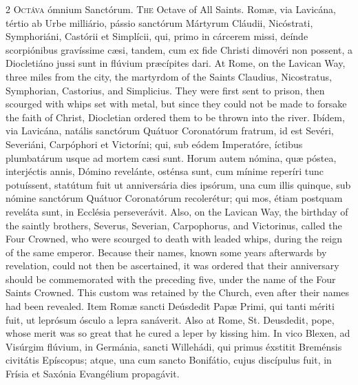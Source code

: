 \begin{paracol}{2}
\lettrine[lines=1]{O}{ctáva} ómnium 
 Sanctórum.
\switchcolumn
{}
\lettrine[lines=1]{T}{he} Octave of All Saints.
\switchcolumn*
{}
Romæ, via Lavicána, 
 tértio ab Urbe milliário, pássio sanctórum Mártyrum Cláudii, Nicóstrati, 
 Symphoriáni, Castórii et Simplícii, qui, primo in cárcerem missi, deínde 
 scorpiónibus gravíssime cæsi, tandem, cum ex fide Christi dimovéri non 
 possent, a Diocletiáno jussi sunt in flúvium præcípites dari.
\switchcolumn
{}
At Rome, on the Lavican Way, three 
 miles from the city, the martyrdom of the Saints Claudius, Nicostratus, 
 Symphorian, Castorius, and Simplicius. They were first sent to prison, 
 then scourged with whips set with metal, but since they could not be made to 
 forsake the faith of Christ, Diocletian ordered them to be thrown into the 
 river.
\switchcolumn*
{}
Ibídem, via Lavicána, 
 natális sanctórum Quátuor Coronatórum fratrum, id est Sevéri, Severiáni, 
 Carpóphori et Victoríni; qui, sub eódem Imperatóre, íctibus plumbatárum 
 usque ad mortem cæsi sunt. Horum autem nómina, quæ póstea, interjéctis 
 annis, Dómino revelánte, osténsa sunt, cum mínime reperíri tunc potuíssent, 
 statútum fuit ut anniversária dies ipsórum, una cum illis quinque, sub 
 nómine sanctórum Quátuor Coronatórum recolerétur; qui mos, étiam postquam 
 reveláta sunt, in Ecclésia perseverávit.
\switchcolumn
{}
Also, on the Lavican Way, the 
 birthday of the saintly brothers, Severus, Severian, Carpophorus, and 
 Victorinus, called the Four Crowned, who were scourged to death with leaded 
 whips, during the reign of the same emperor. Because their names, 
 known some years afterwards by revelation, could not then be ascertained, it 
 was ordered that their anniversary should be commemorated with the preceding 
 five, under the name of the Four Saints Crowned. This custom was 
 retained by the Church, even after their names had been revealed.
\switchcolumn*
{}
Item Romæ sancti 
 Deúsdedit Papæ Primi, qui tanti mériti fuit, ut leprósum ósculo a lepra 
 sanáverit.
\switchcolumn
{}
Also at Rome, St. Deusdedit, pope, 
 whose merit was so great that he cured a leper by kissing him.
\switchcolumn*
{}
In vico Blexen, ad 
 Visúrgim flúvium, in Germánia, sancti Willehádi, qui primus éxstitit 
 Breménsis civitátis Epíscopus; atque, una cum sancto Bonifátio, cujus 
 discípulus fuit, in Frísia et Saxónia Evangélium propagávit.

\end{paracol}
